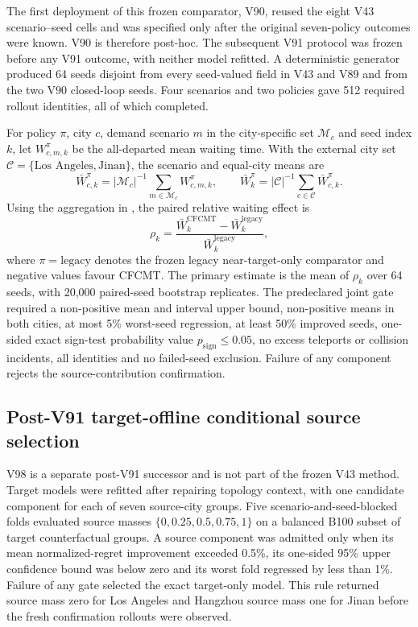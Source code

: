 The first deployment of this frozen comparator, V90, reused the eight V43
scenario--seed cells and was specified only after the original seven-policy
outcomes were known.  V90 is therefore post-hoc.  The subsequent V91 protocol
was frozen before any V91 outcome, with neither model refitted.  A deterministic
generator produced 64 seeds disjoint from every seed-valued field in V43 and
V89 and from the two V90 closed-loop seeds.  Four scenarios and two policies
gave 512 required rollout identities, all of which completed.

For policy $\pi$, city $c$, demand scenario $m$ in the city-specific set
$\mathcal M_c$ and seed index $k$, let $W^\pi_{c,m,k}$ be the all-departed
mean waiting time.  With the external city set
$\mathcal C=\{\text{Los Angeles},\text{Jinan}\}$, the scenario and equal-city
means are
\begin{equation}
 \bar W^{\pi}_{c,k}=|\mathcal M_c|^{-1}
   \sum_{m\in\mathcal M_c} W^{\pi}_{c,m,k},\qquad
 \bar W^{\pi}_{k}=|\mathcal C|^{-1}
   \sum_{c\in\mathcal C} \bar W^{\pi}_{c,k}.
 \label{eq:waiting-aggregation}
\end{equation}
Using the aggregation in , the paired relative
waiting effect is
\begin{equation}
 \rho_k=\frac{\bar W^{\mathrm{CFCMT}}_k-
              \bar W^{\mathrm{legacy}}_k}
             {\bar W^{\mathrm{legacy}}_k},
 \label{eq:source-contribution}
\end{equation}
where $\pi=\mathrm{legacy}$ denotes the frozen legacy near-target-only
comparator and negative values favour CFCMT.  The primary estimate is the mean of
$\rho_k$ over 64 seeds, with 20,000 paired-seed bootstrap replicates.  The
predeclared joint gate required a non-positive mean and interval upper bound,
non-positive means in both cities, at most 5\% worst-seed regression, at least
50\% improved seeds, one-sided exact sign-test probability value
$p_{\mathrm{sign}}\leq0.05$, no excess
teleports or collision incidents, all identities and no failed-seed exclusion.
Failure of any component rejects the source-contribution confirmation.

\subsection{Post-V91 target-offline conditional source selection}

V98 is a separate post-V91 successor and is not part of the frozen V43 method.
Target models were refitted after repairing topology context, with one candidate
component for each of seven source-city groups.  Five scenario-and-seed-blocked
folds evaluated source masses $\{0,0.25,0.5,0.75,1\}$ on a balanced B100 subset
of target counterfactual groups.  A source component was admitted only when its
mean normalized-regret improvement exceeded 0.5\%, its one-sided 95\% upper
confidence bound was below zero and its worst fold regressed by less than 1\%.
Failure of any gate selected the exact target-only model.  This rule returned
source mass zero for Los Angeles and Hangzhou source mass one for Jinan before
the fresh confirmation rollouts were observed.

